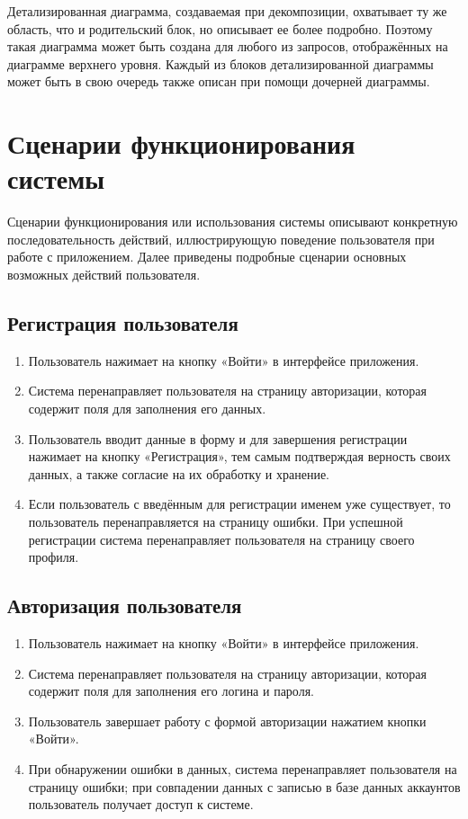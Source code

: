 \documentclass{bmstu-gost-7-32}
\begin{document}

Детализированная диаграмма, создаваемая при декомпозиции, охватывает ту же область, что и родительский блок, но описывает ее более подробно.
Поэтому такая диаграмма может быть создана для любого из запросов, отображённых на диаграмме верхнего уровня.
Каждый из блоков детализированной диаграммы может быть в свою очередь также описан при помощи дочерней диаграммы.

\section*{Сценарии функционирования системы}

Сценарии функционирования или использования системы описывают конкретную последовательность действий, иллюстрирующую поведение пользователя при работе с приложением.
Далее приведены подробные сценарии основных возможных действий пользователя.

\subsection*{Регистрация пользователя}

\begin{enumerate}
	\item Пользователь нажимает на кнопку «Войти» в интерфейсе приложения.
	\item Система перенаправляет пользователя на страницу авторизации, которая содержит поля для заполнения его данных.
	\item Пользователь вводит данные в форму и для завершения регистрации нажимает на кнопку «Регистрация», тем самым подтверждая верность своих данных, а также согласие на их обработку и хранение.
	\item Если пользователь с введённым для регистрации именем уже существует, то
	пользователь перенаправляется на страницу ошибки.
	При успешной регистрации система перенаправляет пользователя на страницу своего профиля.
\end{enumerate}

\subsection*{Авторизация пользователя}

\begin{enumerate}
	\item Пользователь нажимает на кнопку «Войти» в интерфейсе приложения.
	\item Система перенаправляет пользователя на страницу авторизации, которая содержит поля для заполнения его логина и пароля.
	\item Пользователь завершает работу с формой авторизации нажатием кнопки «Войти».
	\item При обнаружении ошибки в данных, система перенаправляет пользователя на страницу ошибки; при совпадении данных с записью в базе данных аккаунтов пользователь получает доступ к системе.
\end{enumerate}
\end{document}
